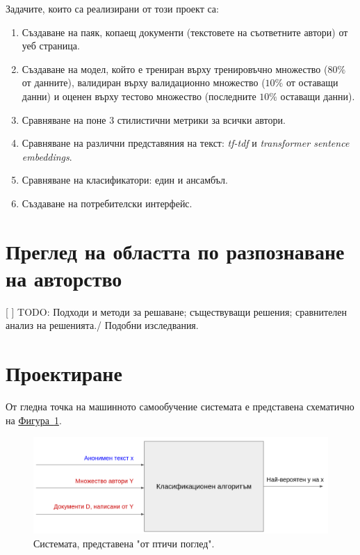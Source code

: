 \documentclass[12pt]{article}
\begin{document}
    Задачите, които са реализирани от този проект са:
    
    \begin{enumerate}
        \item Създаване на паяк, копаещ документи (текстовете на съответните автори) от уеб страница.
        \item Създаване на модел, който е трениран върху тренировъчно множество ($80\%$ от данните), валидиран върху валидационно множество ($10\%$ от оставащи данни) и оценен върху тестово множество (последните $10\%$ оставащи данни).
        \item Сравняване на поне 3 стилистични метрики за всички автори.
        \item Сравняване на различни представяния на текст: \textit{tf-tdf} и \textit{transformer sentence embeddings}.
        \item Сравняване на класификатори: един и ансамбъл.
        \item Създаване на потребителски интерфейс.
    \end{enumerate}
    

\section{Преглед на областта по разпознаване на авторство}

[ ] TODO: Подходи и методи за решаване; съществуващи решения; сравнителен анализ на решенията./ Подобни изследвания.


\section{Проектиране}

    От гледна точка на машинното самообучение системата е представена схематично на \hyperref[fig:bigP]{Фигура~\ref*{fig:bigP}}.
    
    \begin{figure}
    \centering
        \includegraphics[scale=0.3]{./images/big_picture.png}
        \caption{Системата, представена "от птичи поглед".}
        \label{fig:bigP}
    \end{figure}
    
\end{document}
